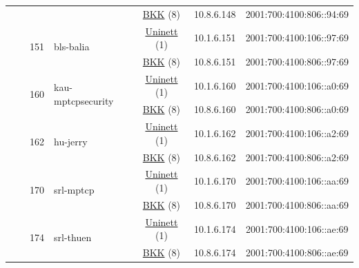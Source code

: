 \begin{small}
\begin{center}
\begin{longtable}{|c|c|c|c|c|c|c|c|}
  &  &  &  & \multicolumn{2}{|c|}{\tiny{\href{http://bkk.no}{BKK} (8)}} & \tiny{10.8.6.148} & \tiny{2001:700:4100:806::94:69} \\* \cline{3-3}\cline{4-4}\cline{5-5}\cline{6-6}\cline{7-7}\cline{8-8}
  &  & \multirow{2}{*}{\tiny{151}} & \multicolumn{1}{|l|}{\multirow{2}{*}{\tiny{bls-balia}}} & \multicolumn{2}{|c|}{\tiny{\href{https://www.uninett.no}{Uninett} (1)}} & \tiny{10.1.6.151} & \tiny{2001:700:4100:106::97:69} \\* \cline{5-5}\cline{6-6}\cline{7-7}\cline{8-8}
  &  &  &  & \multicolumn{2}{|c|}{\tiny{\href{http://bkk.no}{BKK} (8)}} & \tiny{10.8.6.151} & \tiny{2001:700:4100:806::97:69} \\* \cline{3-3}\cline{4-4}\cline{5-5}\cline{6-6}\cline{7-7}\cline{8-8}
  &  & \multirow{2}{*}{\tiny{160}} & \multicolumn{1}{|l|}{\multirow{2}{*}{\tiny{kau-mptcpsecurity}}} & \multicolumn{2}{|c|}{\tiny{\href{https://www.uninett.no}{Uninett} (1)}} & \tiny{10.1.6.160} & \tiny{2001:700:4100:106::a0:69} \\* \cline{5-5}\cline{6-6}\cline{7-7}\cline{8-8}
  &  &  &  & \multicolumn{2}{|c|}{\tiny{\href{http://bkk.no}{BKK} (8)}} & \tiny{10.8.6.160} & \tiny{2001:700:4100:806::a0:69} \\* \cline{3-3}\cline{4-4}\cline{5-5}\cline{6-6}\cline{7-7}\cline{8-8}
  &  & \multirow{2}{*}{\tiny{162}} & \multicolumn{1}{|l|}{\multirow{2}{*}{\tiny{hu-jerry}}} & \multicolumn{2}{|c|}{\tiny{\href{https://www.uninett.no}{Uninett} (1)}} & \tiny{10.1.6.162} & \tiny{2001:700:4100:106::a2:69} \\* \cline{5-5}\cline{6-6}\cline{7-7}\cline{8-8}
  &  &  &  & \multicolumn{2}{|c|}{\tiny{\href{http://bkk.no}{BKK} (8)}} & \tiny{10.8.6.162} & \tiny{2001:700:4100:806::a2:69} \\* \cline{3-3}\cline{4-4}\cline{5-5}\cline{6-6}\cline{7-7}\cline{8-8}
  &  & \multirow{2}{*}{\tiny{170}} & \multicolumn{1}{|l|}{\multirow{2}{*}{\tiny{srl-mptcp}}} & \multicolumn{2}{|c|}{\tiny{\href{https://www.uninett.no}{Uninett} (1)}} & \tiny{10.1.6.170} & \tiny{2001:700:4100:106::aa:69} \\* \cline{5-5}\cline{6-6}\cline{7-7}\cline{8-8}
  &  &  &  & \multicolumn{2}{|c|}{\tiny{\href{http://bkk.no}{BKK} (8)}} & \tiny{10.8.6.170} & \tiny{2001:700:4100:806::aa:69} \\* \cline{3-3}\cline{4-4}\cline{5-5}\cline{6-6}\cline{7-7}\cline{8-8}
  &  & \multirow{2}{*}{\tiny{174}} & \multicolumn{1}{|l|}{\multirow{2}{*}{\tiny{srl-thuen}}} & \multicolumn{2}{|c|}{\tiny{\href{https://www.uninett.no}{Uninett} (1)}} & \tiny{10.1.6.174} & \tiny{2001:700:4100:106::ae:69} \\* \cline{5-5}\cline{6-6}\cline{7-7}\cline{8-8}
  &  &  &  & \multicolumn{2}{|c|}{\tiny{\href{http://bkk.no}{BKK} (8)}} & \tiny{10.8.6.174} & \tiny{2001:700:4100:806::ae:69} \\ \hline
\end{longtable}
\end{center}
\end{small}



